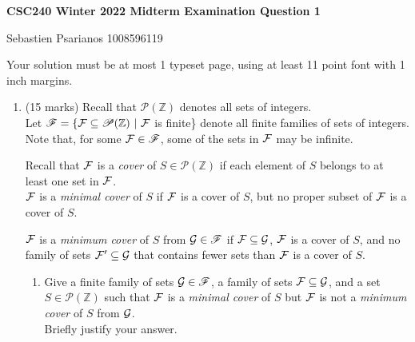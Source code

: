 \documentclass[11pt]{article}
\def\ints{{\mathbb Z}}
\begin{document}
\begin{center}
{\bf \Large \bf CSC240 Winter 2022 Midterm Examination Question 1}\\
\begin{solution}
Sebastien Psarianos 1008596119
\end{solution}
\end{center}

\begin{question}
Your solution must be at most 1 typeset page, using at least 11 point font with 1 inch margins.
\end{question}


\begin{enumerate}
\item
\begin{question}
(15 marks)
Recall that $\mathscr{P}(\ints)$ denotes all sets of integers.\\
Let $\mathscr{F} = \{ {\cal F} \subseteq \mathscr{P}(\ints)\ |\ {\cal F}$ is finite\} denote all finite families of sets of integers.\\
Note that, for some ${\cal F} \in \mathscr{F}$, some of the sets in ${\cal F}$ may be infinite.

Recall that ${\cal F}$ is a  {\em cover} of $S \in \mathscr{P}(\ints)$
if  each element of $S$ belongs to at least one set in ${\cal F}$.\\
${\cal F}$ is a {\em minimal cover} of $S$ if
${\cal F}$ is a cover of $S$,
but  no proper subset of ${\cal F}$ is a cover of  $S$.

${\cal F}$ is a {\em minimum cover} of $S$ from ${\cal G} \in \mathscr{F}$
if ${\cal F} \subseteq {\cal G}$, ${\cal F}$ is a cover of $S$,  and no family of  sets ${\cal F'} \subseteq {\cal G}$
that contains fewer sets than ${\cal F}$ is a cover of $S$.
\end{question}

\begin{enumerate}
\item
\begin{question}
Give a  finite family of sets ${\cal G}  \in \mathscr{F}$, a family of sets ${\cal F} \subseteq {\cal G}$, and a set $S \in \mathscr{P}(\ints)$ such that ${\cal F}$ is a {\em minimal cover} of $S$ but
${\cal F}$ is not a {\em minimum cover} of $S$ from ${\cal G}$. \\
Briefly justify your answer.
\end{question}


\end{enumerate}
\end{enumerate}
\end{document}

